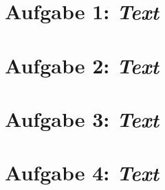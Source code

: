  
\section*{Aufgabe 1: \emph{Text}}




\section*{Aufgabe 2: \emph{Text}}


\section*{Aufgabe 3: \emph{Text}}

\section*{Aufgabe 4: \emph{Text}}
